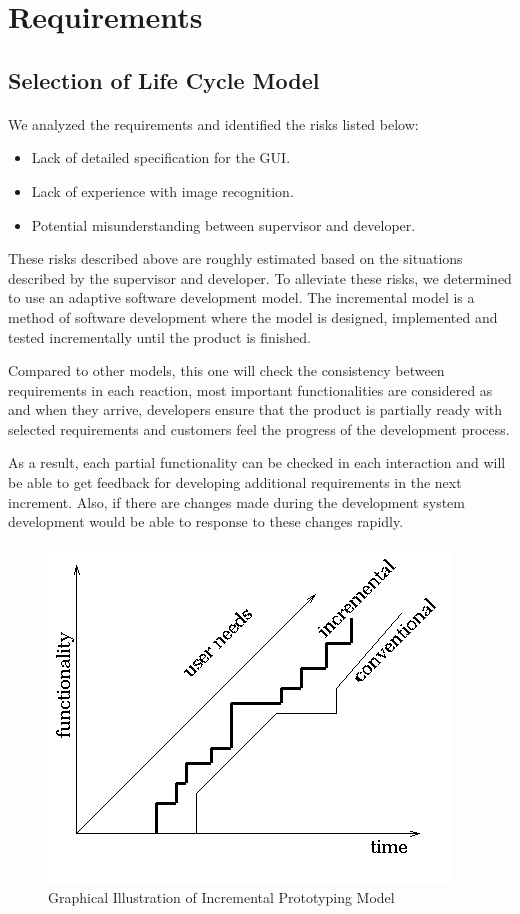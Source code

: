 \section{Requirements}
\label{sec:Requirements}

\subsection{Selection of Life Cycle Model}
\paragraph{} We analyzed the requirements and identified the risks listed below:
\begin{itemize}
\item Lack of detailed specification for the GUI.
\item Lack of experience with image recognition.
\item Potential misunderstanding between supervisor and developer.
\end{itemize}
\par These risks described above are roughly estimated based on the situations described by the supervisor and developer. To alleviate these risks, we determined to use an adaptive software development model. The incremental model is a method of software development where the model is designed, implemented and tested incrementally until the product is finished. 
\par Compared to other models, this one will check the consistency between requirements in each reaction, most important functionalities are considered as and when they arrive, developers ensure that the product is partially ready with selected requirements and customers feel the progress of the development process.
\par As a result, each partial functionality can be checked in each interaction and will be able to get feedback for developing additional requirements in the next increment. Also, if there are changes made during the development system development would be able to response to these changes rapidly.

\begin{figure}[htb]
\centering
\includegraphics[width=.5\textwidth]{section02/assets/IncrementalModel.png}
\caption[Short Caption 2]{\label{IncrmentalModel}Graphical Illustration of Incremental Prototyping Model}
\end{figure}

